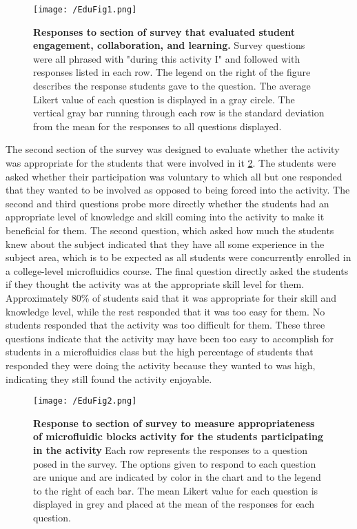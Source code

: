 \begin{figure}[h!] %
\centering
\texttt{[image: /EduFig1.png]}
\caption[\textbf{Responses to section of survey that evaluated student engagement, collaboration, and learning.}]{\textbf{Responses to section of survey that evaluated student engagement, collaboration, and learning.} Survey questions were all phrased with "during this activity I" and followed with responses listed in each row. The legend on the right of the figure describes the response students gave to the question. The average Likert value of each question is displayed in a gray circle. The vertical gray bar running through each row is the standard deviation from the mean for the responses to all questions displayed.}
\label{figure:EduFig1}
\end{figure}
\FloatBarrier

The second section of the survey was designed to evaluate whether the activity was appropriate for the students that were involved in it \ref{figure:EduFig2}. The students were asked whether their participation was voluntary to which all but one responded that they wanted to be involved as opposed to being forced into the activity. The second and third questions probe more directly whether the students had an appropriate level of knowledge and skill coming into the activity to make it beneficial for them. The second question, which asked how much the students knew about the subject indicated that they have all some experience in the subject area, which is to be expected as all students were concurrently enrolled in a college-level microfluidics course. The final question directly asked the students if they thought the activity was at the appropriate skill level for them. Approximately 80\% of students said that it was appropriate for their skill and knowledge level, while the rest responded that it was too easy for them. No students responded that the activity was too difficult for them. These three questions indicate that the activity may have been too easy to accomplish for students in a microfluidics class but the high percentage of students that responded they were doing the activity because they wanted to was high, indicating they still found the activity enjoyable. 

\begin{figure}[h!] %
\centering
\texttt{[image: /EduFig2.png]}
\caption[\textbf{Response to section of survey to measure appropriateness of microfluidic blocks activity for the students participating in the activity}]{\textbf{Response to section of survey to measure appropriateness of microfluidic blocks activity for the students participating in the activity} Each row represents the responses to a question posed in the survey. The options given to respond to each question are unique and are indicated by color in the chart and to the legend to the right of each bar. The mean Likert value for each question is displayed in grey and placed at the mean of the responses for each question.}
\label{figure:EduFig2}
\end{figure}


